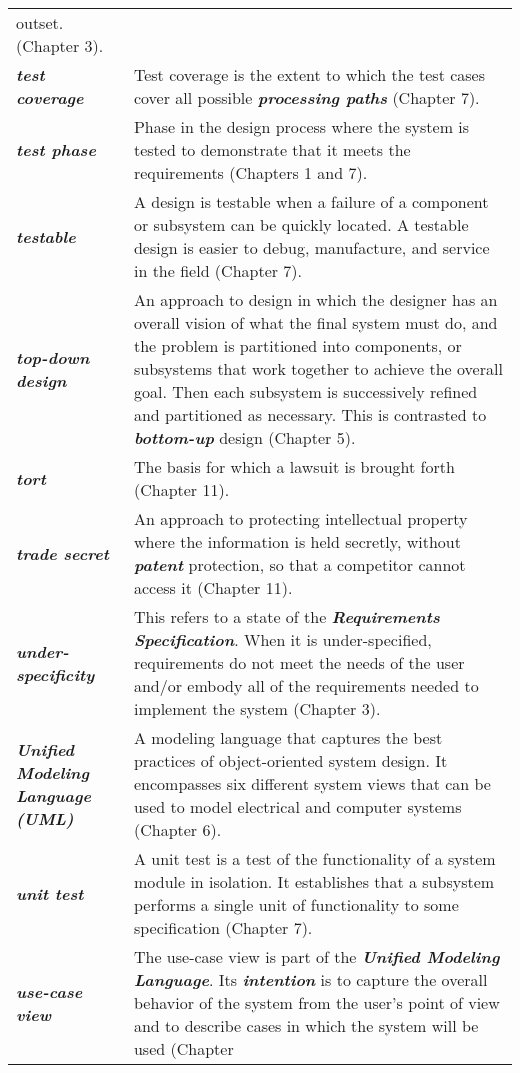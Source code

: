 \begin{longtable} { p{4cm} p{11cm}}
outset. (Chapter 3). \\
\emph{\textbf{test coverage}} & Test coverage is the extent to which the
test cases cover all possible \emph{\textbf{processing paths}} (Chapter
7). \\
\emph{\textbf{test phase}} & Phase in the design process where the
system is tested to demonstrate that it meets the requirements (Chapters
1 and 7). \\
\emph{\textbf{testable}} & A design is testable when a failure of a
component or subsystem can be quickly located. A testable design is
easier to debug, manufacture, and service in the field (Chapter 7). \\
\emph{\textbf{top-down design}} & An approach to design in which the
designer has an overall vision of what the final system must do, and the
problem is parti­tioned into components, or subsystems that work together
to achieve the overall goal. Then each subsystem is successively refined
and partitioned as necessary. This is contrasted to
\emph{\textbf{bottom-up}} design (Chapter 5). \\
\emph{\textbf{tort}} & The basis for which a lawsuit is brought forth
(Chapter 11). \\
\emph{\textbf{trade secret}} & An approach to protecting intellectual
property where the information is held secretly, without
\emph{\textbf{patent}} protection, so that a competitor cannot access it
(Chapter 11). \\
\emph{\textbf{under-specificity}} & This refers to a state of the
\emph{\textbf{Requirements Specification}}. When it is under-specified,
requirements do not meet the needs of the user and/or embody all of the
requirements needed to implement the system (Chapter 3). \\
\emph{\textbf{Unified Modeling Language (UML)}} & A modeling language
that captures the best practices of object-oriented system design. It
encompasses six different system views that can be used to model
electrical and computer systems (Chapter 6). \\
\emph{\textbf{unit test}} & A unit test is a test of the functionality
of a system module in isolation. It establishes that a subsystem
performs a single unit of functionality to some specification (Chapter
7). \\
\emph{\textbf{use-case view}} & The use-case view is part of the
\emph{\textbf{Unified Modeling Language}}. Its \emph{\textbf{intention}}
is to capture the overall behavior of the system from the user's point
of view and to describe cases in which the system will be used (Chapter

\end{longtable}
